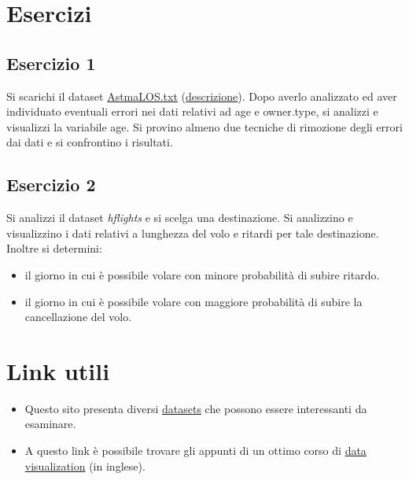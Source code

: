 \documentclass[]{book}
\providecommand{\tightlist}{%
  \setlength{\itemsep}{0pt}\setlength{\parskip}{0pt}}
\begin{document}
\hypertarget{esercizi-1}{%
\section{Esercizi}\label{esercizi-1}}

\hypertarget{esercizio-1-1}{%
\subsection{Esercizio 1}\label{esercizio-1-1}}

Si scarichi il dataset \href{http://extras.springer.com/2012/978-1-4614-1301-1}{AstmaLOS.txt} (\href{https://www.dropbox.com/s/kjhafwojufpwaga/AsthmaLOS_description.txt?dl=0}{descrizione}). Dopo averlo analizzato ed aver individuato eventuali errori nei dati relativi ad age e owner.type, si analizzi e visualizzi la variabile age. Si provino almeno due tecniche di rimozione degli errori dai dati e si confrontino i risultati.

\hypertarget{esercizio-2-1}{%
\subsection{Esercizio 2}\label{esercizio-2-1}}

Si analizzi il dataset \emph{hflights} e si scelga una destinazione. Si analizzino e visualizzino i dati relativi a lunghezza del volo e ritardi per tale destinazione. Inoltre si determini:

\begin{itemize}
\tightlist
\item
  il giorno in cui è possibile volare con minore probabilità di subire ritardo.
\item
  il giorno in cui è possibile volare con maggiore probabilità di subire la cancellazione del volo.
\end{itemize}

\hypertarget{link-utili-2}{%
\section{Link utili}\label{link-utili-2}}

\begin{itemize}
\item
  Questo sito presenta diversi \href{http://college.cengage.com/mathematics/brase/understandable_statistics/7e/students/datasets/slr/frames/frame.html}{datasets} che possono essere interessanti da esaminare.
\item
  A questo link è possibile trovare gli appunti di un ottimo corso di \href{http://vissoc.co}{data visualization} (in inglese).
\end{itemize}
\end{document}
